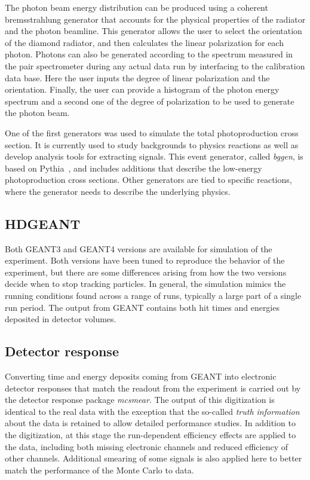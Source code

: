 The photon beam energy distribution can be produced using a coherent bremsstrahlung generator that accounts for the physical properties of the radiator and the photon beamline. This generator allows the user to select the orientation of the diamond radiator, and then calculates the linear polarization for each photon. Photons can also be generated according to the spectrum measured in the pair spectrometer during any actual data run by interfacing to the calibration data base. Here the user inputs the degree of linear polarization and the orientation. Finally, the user can provide a histogram of the photon energy spectrum and a second one of the degree of polarization to be used to generate the photon beam. 

One of the first generators was used to simulate the total photoproduction cross section. It is currently used to study backgrounds to physics reactions as well as develop analysis tools for extracting signals. This event generator, called {\em bggen}, is based on Pythia~\cite{Sjostrand:2006za}, and includes additions that describe the low-energy photoproduction cross sections. Other generators are tied to specific reactions, where the generator needs to describe the underlying physics.

\subsection{HDGEANT \label{sec:hdgeant}}
Both GEANT3 and GEANT4 versions are available for simulation of the experiment. Both versions have been tuned to reproduce the behavior of the experiment, but there are some differences arising from how the two versions decide when to stop tracking particles. In general, the simulation mimics the running conditions found across a range of runs, typically a large part of a single run period. The output from GEANT contains both hit times and energies deposited in detector volumes. 

\subsection[Detector response]{Detector response}
Converting time and energy deposits coming from GEANT into electronic detector responses that match the readout from the experiment is carried out by the detector response package \textit{mcsmear}. The output of this digitization is identical to the real data with the exception that the so-called \emph{truth information} about the data is retained to allow detailed performance studies. In addition to the digitization, at this stage the run-dependent efficiency effects are applied to the data, including both missing electronic channels and reduced efficiency of other channels. Additional smearing of some signals is also applied here to better match the performance of the Monte Carlo to data. 

